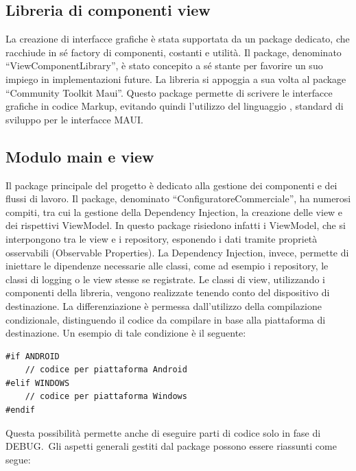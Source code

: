 \subsection{Libreria di componenti view}
La creazione di interfacce grafiche è stata supportata da un package dedicato,
che racchiude in sé factory di componenti, costanti e utilità.
Il package, denominato ``ViewComponentLibrary'', è stato concepito a sé stante
per favorire un suo impiego in implementazioni future.
La libreria si appoggia a sua volta al package \nuget{} ``Community Toolkit Maui''\cite{ComTolkit}.
Questo package permette di scrivere le interfacce grafiche in codice \csharp{} Markup,
evitando quindi l'utilizzo del linguaggio \xaml\cite{XAML},
standard di sviluppo per le interfacce MAUI.\

\subsection{Modulo main e view}
Il package principale del progetto è dedicato alla gestione dei componenti
e dei flussi di lavoro.
Il package, denominato ``ConfiguratoreCommerciale'', ha numerosi compiti,
tra cui la gestione della Dependency Injection, la creazione delle view e dei rispettivi ViewModel.
In questo package risiedono infatti i ViewModel, che si interpongono tra le view e i repository,
esponendo i dati tramite proprietà osservabili (Observable Properties).
La Dependency Injection, invece, permette di iniettare
le dipendenze necessarie alle classi, come ad esempio i repository, le classi di logging o le view stesse se registrate.
Le classi di view, utilizzando i componenti della libreria,
vengono realizzate tenendo conto del dispositivo di destinazione.
La differenziazione è permessa dall'utilizzo della compilazione condizionale,
distinguendo il codice da compilare in base alla piattaforma di destinazione.
Un esempio di tale condizione è il seguente:
\begin{lstlisting}[language=CSharp]
#if ANDROID
    // codice per piattaforma Android
#elif WINDOWS
    // codice per piattaforma Windows
#endif
\end{lstlisting}
Questa possibilità permette anche di eseguire parti di codice solo in fase di DEBUG.\
Gli aspetti generali gestiti dal package possono essere riassunti come segue:
